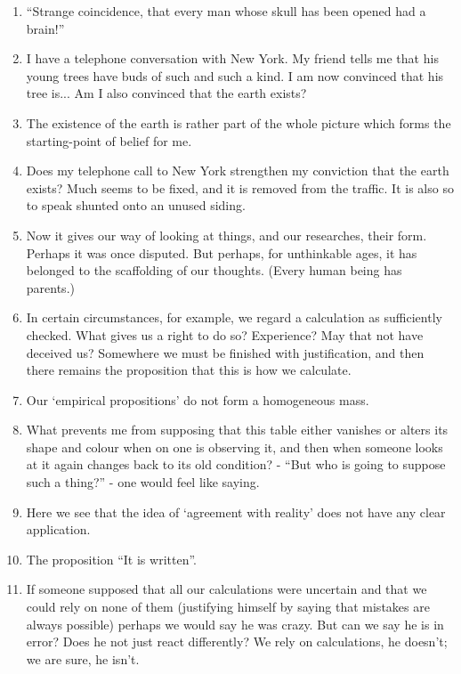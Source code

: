 \documentclass{book}
\begin{document}
\begin{enumerate}
\item
``Strange coincidence, that every man whose skull has been opened had a
brain!''

\item
I have a telephone conversation with New York. My friend tells me that his
young trees have buds of such and such a kind. I am now convinced that his tree
is... Am I also convinced that the earth exists?

\item
The existence of the earth is rather part of the whole picture which forms the
starting-point of belief for me.

\item
Does my telephone call to New York strengthen my conviction that the earth
exists?  Much seems to be fixed, and it is removed from the traffic. It is also
so to speak shunted onto an unused siding.

\item
Now it gives our way of looking at things, and our researches, their form.
Perhaps it was once disputed. But perhaps, for unthinkable ages, it has
belonged to the scaffolding of our thoughts. (Every human being has parents.)

\item
In certain circumstances, for example, we regard a calculation as sufficiently
checked. What gives us a right to do so? Experience? May that not have deceived
us? Somewhere we must be finished with justification, and then there remains
the proposition that this is how we calculate.

\item
Our `empirical propositions' do not form a homogeneous mass.

\item
What prevents me from supposing that this table either vanishes or alters its
shape and colour when on one is observing it, and then when someone looks at it
again changes back to its old condition? - ``But who is going to suppose such a
thing?'' - one would feel like saying.

\item
Here we see that the idea of `agreement with reality' does not have any clear
application.

\item
The proposition ``It is written''.

\item
If someone supposed that all our calculations were uncertain and that we could
rely on none of them (justifying himself by saying that mistakes are always
possible) perhaps we would say he was crazy. But can we say he is in error?
Does he not just react differently? We rely on calculations, he doesn't; we are
sure, he isn't.


\end{enumerate}
\end{document}
